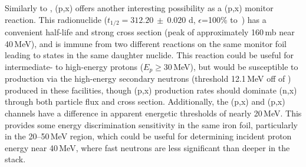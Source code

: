 

Similarly to ,  (p,x)  offers another interesting possibility as a (p,x) monitor reaction.
This radionuclide ($t_{1/2}=312.20~\pm~0.020$ d, $\epsilon$=100\% to \,\cite{Dong2014}) has a convenient half-life and strong cross section (peak of approximately 160\,mb near 40\,MeV), and is immune from two different reactions on the same monitor foil leading to states in the same daughter nuclide.
This reaction could be useful for intermediate- to high-energy protons ($E_p \geq$30\,MeV), but would be susceptible to production via the high-energy secondary neutrons  (threshold 12.1\,MeV off of ) produced in these facilities, though (p,x) production rates should dominate (n,x) through both particle flux and cross section. 
Additionally, the (p,x) and (p,x) channels have a difference in apparent energetic thresholds of nearly 20\,MeV.
This provides some energy discrimination sensitivity in the same iron foil, particularly in the 20--50\,MeV region, which could be useful for determining incident proton energy near 40\,MeV, where fast neutrons are less significant than deeper in the stack.







% 
% 
% 


